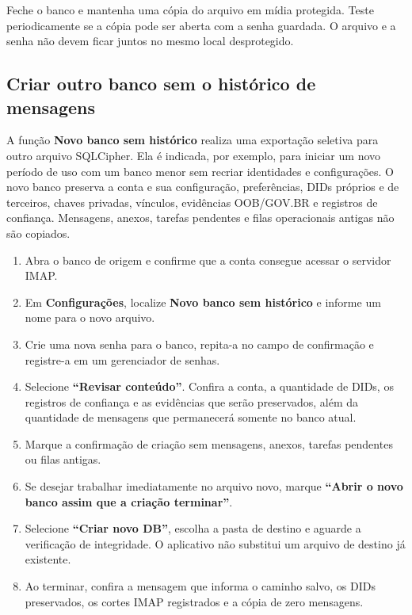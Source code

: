 \documentclass[11pt,a4paper]{article}
\newcommand{\uis}[1]{\textbf{``#1''}}
\newcommand{\menu}[1]{\textbf{#1}}
\begin{document}
\begin{tipbox}
  Feche o banco e mantenha uma cópia do arquivo em mídia protegida. Teste periodicamente se a cópia pode ser aberta com a senha guardada. O arquivo e a senha não devem ficar juntos no mesmo local desprotegido.
\end{tipbox}

\subsection{Criar outro banco sem o histórico de mensagens}

A função \menu{Novo banco sem histórico} realiza uma exportação seletiva para outro arquivo SQLCipher. Ela é indicada, por exemplo, para iniciar um novo período de uso com um banco menor sem recriar identidades e configurações. O novo banco preserva a conta e sua configuração, preferências, DIDs próprios e de terceiros, chaves privadas, vínculos, evidências OOB/GOV.BR e registros de confiança. Mensagens, anexos, tarefas pendentes e filas operacionais antigas não são copiados.

\begin{enumerate}
  \item Abra o banco de origem e confirme que a conta consegue acessar o servidor IMAP.
  \item Em \menu{Configurações}, localize \menu{Novo banco sem histórico} e informe um nome para o novo arquivo.
  \item Crie uma nova senha para o banco, repita-a no campo de confirmação e registre-a em um gerenciador de senhas.
  \item Selecione \uis{Revisar conteúdo}. Confira a conta, a quantidade de DIDs, os registros de confiança e as evidências que serão preservados, além da quantidade de mensagens que permanecerá somente no banco atual.
  \item Marque a confirmação de criação sem mensagens, anexos, tarefas pendentes ou filas antigas.
  \item Se desejar trabalhar imediatamente no arquivo novo, marque \uis{Abrir o novo banco assim que a criação terminar}.
  \item Selecione \uis{Criar novo DB}, escolha a pasta de destino e aguarde a verificação de integridade. O aplicativo não substitui um arquivo de destino já existente.
  \item Ao terminar, confira a mensagem que informa o caminho salvo, os DIDs preservados, os cortes IMAP registrados e a cópia de zero mensagens.
\end{enumerate}
\end{document}

